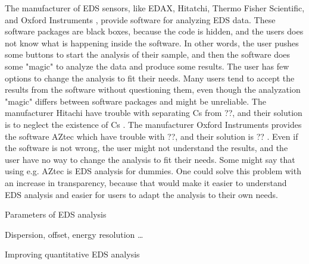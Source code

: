 The manufacturer of EDS sensors, like EDAX, Hitatchi, Thermo Fisher Scientific, and Oxford Instruments , provide software for analyzing EDS data.
These software packages are black boxes, because the code is hidden, and the users does not know what is happening inside the software.
In other words, the user pushes some buttons to start the analysis of their sample, and then the software does some "magic" to analyze the data and produce some results.
The user has few options to change the analysis to fit their needs.
Many users tend to accept the results  from the software without questioning them, even though the analyzation "magic" differs between software packages and might be unreliable.
The manufacturer Hitachi have trouble with separating Cs from ??, and their solution is to neglect the existence of Cs .
The manufacturer Oxford Instruments provides the software AZtec which have trouble with ??, and their solution is ?? .
Even if the software is not wrong, the user might not understand the results, and the user have no way to change the analysis to fit their needs.
Some might say that using e.g. AZtec is EDS analysis for dummies.
One could solve this problem with an increase in transparency, because that would make it easier to understand EDS analysis and easier for users to adapt the analysis to their own needs.





%
%
Parameters of EDS analysis



Dispersion, offset, energy resolution \dots


%
%
Improving quantitative EDS analysis

